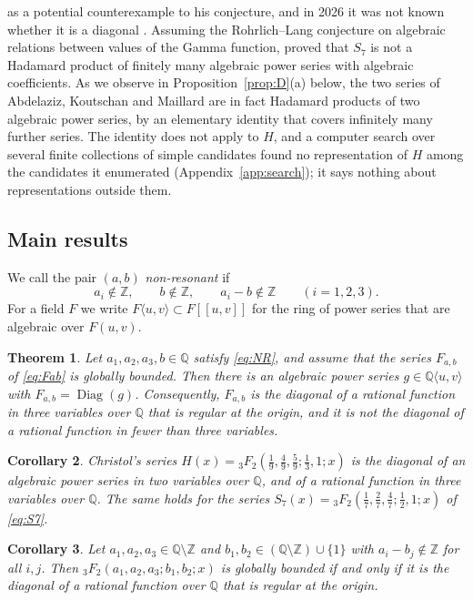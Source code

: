 \documentclass[11pt]{amsart}
\newtheorem{mainthm}{Theorem}
\newtheorem{maincor}[mainthm]{Corollary}
\theoremstyle{definition}
\theoremstyle{remark}
\numberwithin{equation}{section}
\newcommand{\Q}{\mathbb{Q}}
\newcommand{\Z}{\mathbb{Z}}
\newcommand{\alg}[2]{#1\langle #2\rangle}
\DeclareMathOperator{\Diag}{Diag}
\newcommand{\Fab}{F_{a,b}}
\begin{document}
as a potential counterexample to his conjecture, and in 2026 it was not known whether it is a diagonal \citep[Remark~4.2]{HarderKramerMiller2026}. Assuming the Rohrlich--Lang conjecture on algebraic relations between values of the Gamma function, \citet[Proposition~1]{RivoalRoques2014} proved that $S_7$ is not a Hadamard product of finitely many algebraic power series with algebraic coefficients. As we observe in Proposition~\ref{prop:D}(a) below, the two series of Abdelaziz, Koutschan and Maillard are in fact Hadamard products of two algebraic power series, by an elementary identity that covers infinitely many further series. The identity does not apply to $H$, and a computer search over several finite collections of simple candidates found no representation of $H$ among the candidates it enumerated (Appendix~\ref{app:search}); it says nothing about representations outside them.

\subsection{Main results}
We call the pair $(a,b)$ \emph{non-resonant} if
\begin{equation}\tag{NR}\label{eq:NR}
a_i\notin\Z,\qquad b\notin\Z,\qquad a_i-b\notin\Z\qquad(i=1,2,3).
\end{equation}
For a field $F$ we write $\alg F{u,v}\subset F[[u,v]]$ for the ring of power series that are algebraic over $F(u,v)$.

\begin{mainthm}\label{thm:A}
Let $a_1,a_2,a_3,b\in\Q$ satisfy \eqref{eq:NR}, and assume that the series $\Fab$ of \eqref{eq:Fab} is globally bounded. Then there is an algebraic power series $g\in\alg\Q{u,v}$ with $\Fab=\Diag(g)$. Consequently, $\Fab$ is the diagonal of a rational function in three variables over $\Q$ that is regular at the origin, and it is not the diagonal of a rational function in fewer than three variables.
\end{mainthm}

\begin{maincor}\label{cor:B}
Christol's series $H(x)={}_3F_2(\frac19,\frac49,\frac59;\frac13,1;x)$ is the diagonal of an algebraic power series in two variables over $\Q$, and of a rational function in three variables over $\Q$. The same holds for the series $S_7(x)={}_3F_2(\frac17,\frac27,\frac47;\frac12,1;x)$ of \eqref{eq:S7}.
\end{maincor}

\begin{maincor}\label{cor:C}
Let $a_1,a_2,a_3\in\Q\setminus\Z$ and $b_1,b_2\in(\Q\setminus\Z)\cup\{1\}$ with $a_i-b_j\notin\Z$ for all $i,j$. Then ${}_3F_2(a_1,a_2,a_3;b_1,b_2;x)$ is globally bounded if and only if it is the diagonal of a rational function over $\Q$ that is regular at the origin.
\end{maincor}
\end{document}
